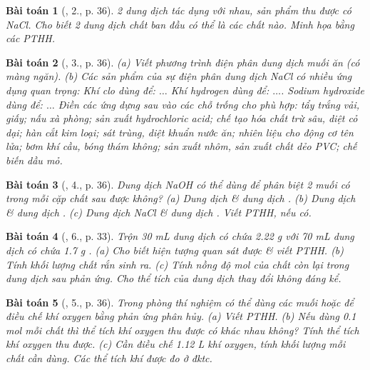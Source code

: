 \documentclass{article}
\newtheorem{baitoan}{Bài toán}
\begin{document}
\begin{baitoan}[\cite{SGK_Hoa_Hoc_9}, 2., p. 36]
	2 dung dịch tác dụng với nhau, sản phẩm thu được có {\rm NaCl}. Cho biết 2 dung dịch chất ban đầu có thể là các chất nào. Minh họa bằng các PTHH.
\end{baitoan}

\begin{baitoan}[\cite{SGK_Hoa_Hoc_9}, 3., p. 36]
	(a) Viết phương trình điện phân dung dịch muối ăn (có màng ngăn). (b) Các sản phẩm của sự điện phân dung dịch {\rm NaCl} có nhiều ứng dụng quan trọng: Khí clo dùng để: $\ldots$ Khí hydrogen dùng để: $\ldots$. Sodium hydroxide dùng để: $\ldots$ Điền các ứng dựng sau vào các chỗ trống cho phù hợp: tẩy trắng vải, giấy; nấu xà phòng; sản xuất hydrochloric acid; chế tạo hóa chất trừ sâu, diệt cỏ dại; hàn cắt kim loại; sát trùng, diệt khuẩn nước ăn; nhiên liệu cho động cơ tên lửa; bơm khí cầu, bóng thám không; sản xuất nhôm, sản xuất chất dẻo PVC; chế biến dầu mỏ.
\end{baitoan}

\begin{baitoan}[\cite{SGK_Hoa_Hoc_9}, 4., p. 36]
	Dung dịch {\rm NaOH} có thể dùng để phân biệt 2 muối có trong mỗi cặp chất sau được không? (a) Dung dịch {\rm{}} \& dung dịch {\rm{}}. (b) Dung dịch {\rm{}} \& dung dịch {\rm{}}. (c) Dung dịch {\rm NaCl} \& dung dịch {\rm{}}. Viết {\rm PTHH}, nếu có.
\end{baitoan}

\begin{baitoan}[\cite{SGK_Hoa_Hoc_9}, 6., p. 33]
	Trộn {\rm30 mL} dung dịch có chứa {\rm2.22 g } với {\rm70 mL} dung dịch có chứa {\rm1.7 g }. (a) Cho biết hiện tượng quan sát được \& viết PTHH. (b) Tính khối lượng chất rắn sinh ra. (c) Tính nồng độ mol của chất còn lại trong dung dịch sau phản ứng. Cho thể tích của dung dịch thay đổi không đáng kể.
\end{baitoan}

\begin{baitoan}[\cite{SGK_Hoa_Hoc_9}, 5., p. 36]
	Trong phòng thí nghiệm có thể dùng các muối {\rm{}} hoặc {\rm{}} để điều chế khí oxygen bằng phản ứng phân hủy. (a) Viết {\rm PTHH}. (b) Nếu dùng {\rm0.1 mol} mỗi chất thì thể tích khí oxygen thu được có khác nhau không? Tính thể tích khí oxygen thu được. (c) Cần điều chế {\rm1.12 L} khí oxygen, tính khối lượng mỗi chất cần dùng. Các thể tích khí được đo ở đktc.
\end{baitoan}
\end{document}
